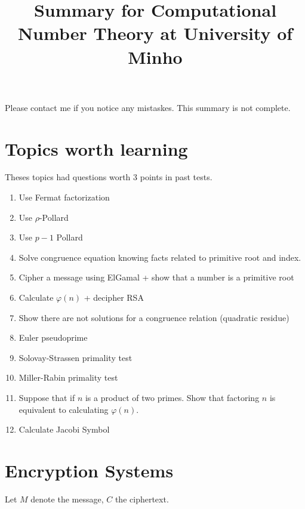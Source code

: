 \documentclass{article}
\title{Summary for Computational Number Theory at University of Minho}
\author{\alef}
\begin{document}
\StartPage[12cm]
	\maketitle

	Please contact me if you notice any mistaskes. This summary is not complete.

	\section{Topics worth learning}

	Theses topics had questions worth 3 points in past tests.

	\begin{enumerate}
		\item Use Fermat factorization
		\item Use $ρ$-Pollard
		\item Use $p-1$ Pollard

		\item Solve congruence equation knowing facts related to primitive root and index.

		\item Cipher a message using ElGamal + show that a number is a primitive root
		\item Calculate $φ(n)$ + decipher RSA

		\item Show there are not solutions for a congruence relation (quadratic residue)

		\item Euler pseudoprime
		\item Solovay-Strassen primality test
		\item Miller-Rabin primality test

		\item Suppose that if $n$ is a product of two primes. Show that factoring $n$ is equivalent to calculating $φ(n)$.

		\item Calculate Jacobi Symbol

	\end{enumerate}

	\section{Encryption Systems}

	\newcommand{\PuK}{\textrm{PubK}}
	\newcommand{\PrK}{\textrm{PrivK}}
	Let $M$ denote the message, $C$ the ciphertext.
\end{document}
